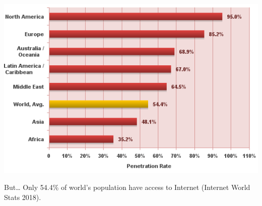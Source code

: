 \documentclass[notitlepage, usenames,dvipsnames]{beamer}
\begin{document}
\begin{frame}
\begin{overlayarea}{\textwidth}{0.9\textheight}
         {
            \vspace{0.5ex}
            \centering\includegraphics[scale=0.45]{../img/internet-penetration.png}

            \vspace{-0.5ex}
            \begin{alertblock}{But\ldots}
                Only 54.4\% of world's population have access to Internet ({\footnotesize Internet World Stats 2018}).
            \end{alertblock}
        }

    \end{overlayarea}
    \end{frame}
\end{document}
